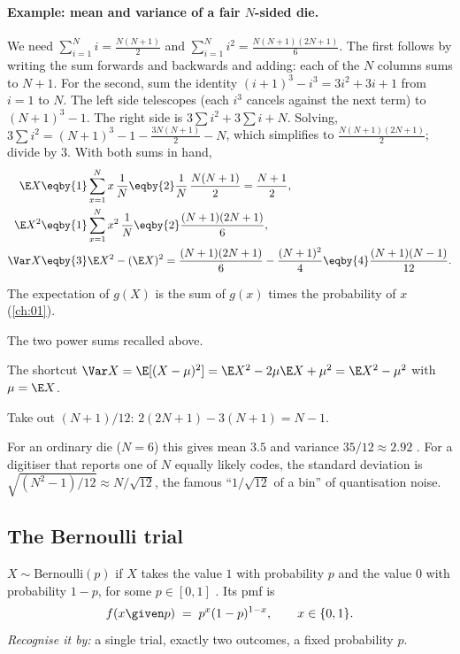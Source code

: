\paragraph{Example: mean and variance of a fair $N$-sided die.}
We need $\sum_{i=1}^N i=\tfrac{N(N+1)}{2}$ and $\sum_{i=1}^N i^2=\tfrac{N(N+1)(2N+1)}{6}$. The first follows by writing the sum forwards and backwards and adding: each of the $N$ columns sums to $N+1$. For the second, sum the identity $(i+1)^3-i^3=3i^2+3i+1$ from $i=1$ to $N$. The left side telescopes (each $i^3$ cancels against the next term) to $(N+1)^3-1$. The right side is $3\sum i^2+3\sum i+N$. Solving, $3\sum i^2=(N+1)^3-1-\tfrac{3N(N+1)}{2}-N$, which simplifies to $\tfrac{N(N+1)(2N+1)}{2}$; divide by $3$. With both sums in hand,
\begin{align*}
  \E X &\eqby{1} \sum_{x=1}^N x\,\frac1N \eqby{2} \frac1N\,\frac{N(N+1)}{2} = \frac{N+1}{2},\\
  \E X^2 &\eqby{1} \sum_{x=1}^N x^2\,\frac1N \eqby{2} \frac{(N+1)(2N+1)}{6},\\
  \Var X &\eqby{3} \E X^2-(\E X)^2
     = \frac{(N+1)(2N+1)}{6}-\frac{(N+1)^2}{4}
     \eqby{4} \frac{(N+1)(N-1)}{12}.
\end{align*}
\begin{explain}
  \item The expectation of $g(X)$ is the sum of $g(x)$ times the probability of $x$ (\cref{ch:01}).
  \item The two power sums recalled above.
  \item The shortcut $\Var X=\E[(X-\mu)^2]=\E X^2-2\mu\E X+\mu^2=\E X^2-\mu^2$ with $\mu=\E X$.
  \item Take out $(N+1)/12$: $2(2N+1)-3(N+1)=N-1$.
\end{explain}
For an ordinary die ($N=6$) this gives mean $3.5$ and variance $35/12\approx2.92$ . For a digitiser that reports one of $N$ equally likely codes, the standard deviation is $\sqrt{(N^2-1)/12}\approx N/\sqrt{12}$, the famous ``$1/\sqrt{12}$ of a bin'' of quantisation noise.

\subsection{The Bernoulli trial}

\begin{workdef}
$X\sim\mathrm{Bernoulli}(p)$ if $X$ takes the value $1$ with probability $p$ and the value $0$ with probability $1-p$, for some $p\in[0,1]$ . Its pmf is
\begin{equation}
  f(x\given p)\;=\;p^{x}(1-p)^{1-x},\qquad x\in\{0,1\}. \label{2a:eq:bern}
\end{equation}
\emph{Recognise it by:} a single trial, exactly two outcomes, a fixed probability $p$.
\end{workdef}

